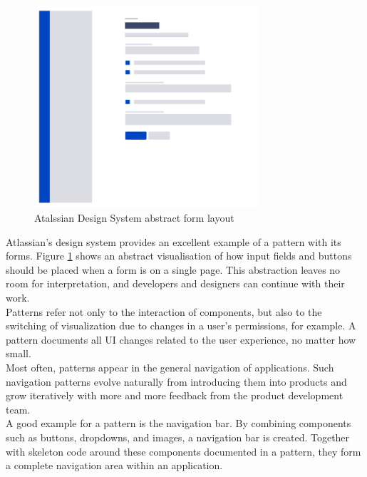 \begin{figure}[htbp]
	\centerline{\includegraphics[height=7.5cm]{images/atlassian_abstract_form.png}}
	\caption{Atalssian Design System abstract form layout \cite{atlassian_design_system_atlassian_nodate}}
	\label{atlassian_form_layout}
\end{figure}
Atlassian's design system provides an excellent example of a pattern with its forms. Figure \ref{atlassian_form_layout} shows an abstract visualisation of how input fields and buttons should be placed when a form is on a single page. This abstraction leaves no room for interpretation, and developers and designers can continue with their work. \\

Patterns refer not only to the interaction of components, but also to the switching of visualization due to changes in a user's permissions, for example. A pattern documents all UI changes related to the user experience, no matter how small. \cite{vesselov_building_2019} \\

Most often, patterns appear in the general navigation of applications. Such navigation patterns evolve naturally from introducing them into products and grow iteratively with more and more feedback from the product development team.
\\
A good example for a pattern is the navigation bar. By combining components such as buttons, dropdowns, and images, a navigation bar is created. Together with skeleton code around these components documented in a pattern, they form a complete navigation area within an application. 
